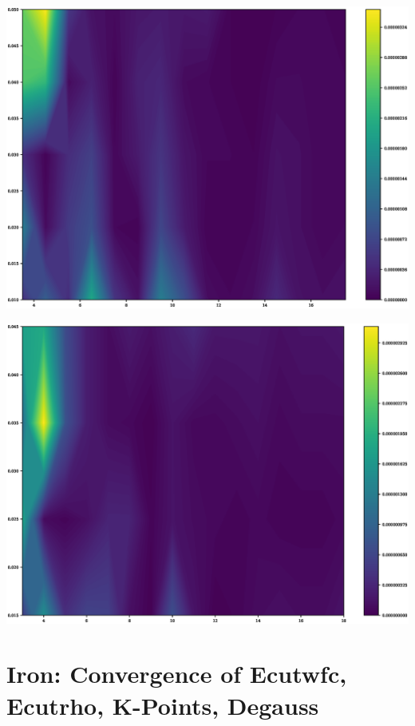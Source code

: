 \begin{center}
\includegraphics[scale=0.35]{appendix/dft_calibration/al/kpoints_force_kpointconv_ry_colour}
\end{center}

\begin{center}
\includegraphics[scale=0.35]{appendix/dft_calibration/al/kpoints_force_smearingconv_ry_colour}
\end{center}




\clearpage

\FloatBarrier
\section{Iron: Convergence of Ecutwfc, Ecutrho, K-Points, Degauss}











\clearpage











